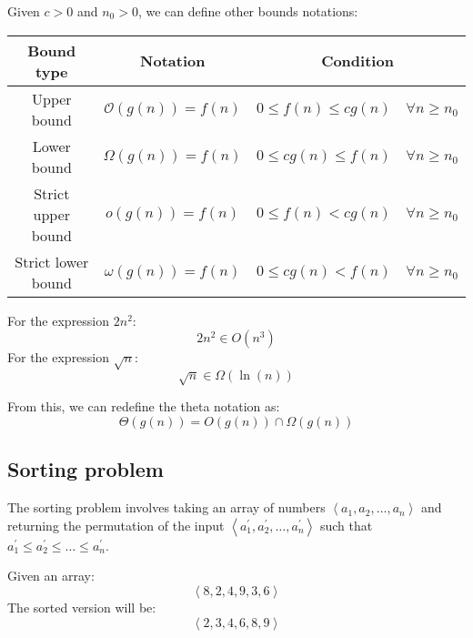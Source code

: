 Given $c > 0$ and $n_0 > 0$, we can define other bounds notations:
\renewcommand*{\arraystretch}{2}
\begin{table}[H]
    \centering
    \begin{tabular}{|c|c|c|}
    \hline
    \textbf{Bound type} & \textbf{Notation}         & \textbf{Condition}                                \\ \hline
    Upper bound         & $\mathcal{O} (g(n))=f(n)$ & $0 \leq f(n) \leq c g(n)\quad \forall n \geq n_0$ \\
    Lower bound         & $\Omega(g(n))=f(n)$       & $0 \leq c g(n) \leq f(n)\quad \forall n \geq n_0$ \\
    Strict upper bound  & $o(g(n))=f(n)$            & $0 \leq f(n) < c g(n)\quad \forall n \geq n_0$    \\
    Strict lower bound  & $\omega(g(n))=f(n)$       & $0 \leq c g(n) < f(n)\quad \forall n \geq n_0$    \\ \hline
    \end{tabular}
\end{table}
\renewcommand*{\arraystretch}{1}
\begin{example}
    For the expression $2n^2$: 
    \[2n^2 \in O(n^3)\]
    For the expression $\sqrt{n}$: 
    \[\sqrt{n} \in \Omega(\ln(n))\]
\end{example}
From this, we can redefine the theta notation as:
\[\Theta(g(n))=O(g(n))\cap\Omega(g(n))\]

\subsection{Sorting problem}
The sorting problem involves taking an array of numbers $\left\langle a_1,a_2,\dots,a_n \right\rangle$ and returning the permutation of the input $\left\langle a_1^\prime,a_2^\prime,\dots,a_n^\prime \right\rangle$ such that $a_1^\prime\leq a_2^\prime \leq \dots \leq a_n^\prime$. 
\begin{example}
    Given an array: 
    \[\left\langle 8, 2, 4, 9, 3, 6 \right\rangle\]
    The sorted version will be: 
    \[\left\langle 2, 3, 4, 6, 8, 9 \right\rangle\]
\end{example}

